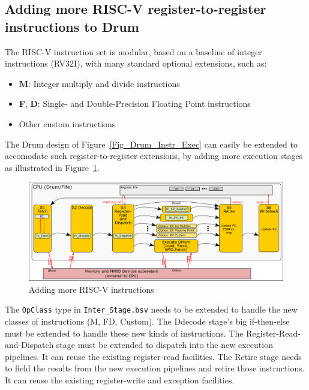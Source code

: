 
\subsection{Adding more RISC-V register-to-register instructions to Drum}


The RISC-V instruction set is modular, based on a baseline of integer
instructions (RV32I), with many standard optional extensions, such as:

\begin{itemize}
 \item {\bf M}: Integer multiply and divide instructions
 \item {\bf F}, {\bf D}: Single- and Double-Precision Floating Point instructions
 \item Other custom instructions
\end{itemize}

The Drum design of Figure~\ref{Fig_Drum_Instr_Exec} can easily be
extended to accomodate such register-to-register extensions, by adding
more execution stages as illustrated in
Figure~\ref{Fig_Additional_RISCV_Instructions}.
\begin{figure}[htbp]
  \centerline{\includegraphics[width=6in,angle=0]{Figures/RSN_2025-09-01.000.00_FifeDrum_Stages_Multilayer_L1_L4}}
  \caption{\label{Fig_Additional_RISCV_Instructions}
           Adding more RISC-V instructions}
\end{figure}

The {\tt OpClass} type in {\tt Inter\_Stage.bsv} needs to be extended
to handle the new classes of instructions (M, FD, Custom).  The
Ddecode stage's big if-then-else must be extended to handle these new
kinds of instructions.  The Register-Read-and-Dispatch stage must be
extended to dispatch into the new execution pipelines.  It can reuse
the existing register-read facilities.  The Retire stage needs to
field the results from the new execution pipelines and retire those
instructions.  It can reuse the existing register-write and exception
facilities.

